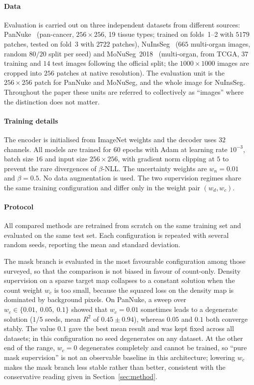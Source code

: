 \documentclass[preprint,12pt]{elsarticle}
\begin{document}
\paragraph{Data} Evaluation is carried out on three independent datasets from different sources:
PanNuke~\cite{pannuke} (pan-cancer, $256\times256$, 19 tissue types; trained on folds~1--2 with $5179$ patches,
tested on fold~3 with $2722$ patches), NuInsSeg~\cite{nuinsseg} ($665$ multi-organ images, random $80/20$ split
per seed) and MoNuSeg~2018~\cite{monuseg} (multi-organ, from TCGA, $37$ training and $14$ test images following
the official split; the $1000\times1000$ images are cropped into $256$ patches at native resolution). The
evaluation unit is the $256\times256$ patch for PanNuke and MoNuSeg, and the whole image for NuInsSeg.
Throughout the paper these units are referred to collectively as ``images'' where the distinction does not
matter.

\paragraph{Training details} The encoder is initialised from ImageNet weights and the decoder uses $32$
channels. All models are trained for $60$ epochs with Adam at learning rate $10^{-3}$, batch size $16$ and
input size $256\times256$, with gradient norm clipping at $5$ to prevent the rare divergences of $\beta$-NLL.
The uncertainty weights are $w_n = 0.01$ and $\beta = 0.5$. No data augmentation is used. The two supervision
regimes share the same training configuration and differ only in the weight pair $(w_d, w_c)$.

\paragraph{Protocol} All compared methods are retrained from scratch on the same training set and evaluated on
the same test set. Each configuration is repeated with several random seeds, reporting the mean and standard
deviation.

The mask branch is evaluated in the most favourable configuration among those surveyed, so that the comparison
is not biased in favour of count-only. Density supervision on a sparse target map collapses to a constant
solution when the count weight $w_c$ is too small, because the squared loss on the density map is dominated by
background pixels. On PanNuke, a sweep over $w_c \in \{0.01,\ 0.05,\ 0.1\}$ showed that $w_c = 0.01$ sometimes
leads to a degenerate solution ($1/5$ seeds, mean $R^2$ of $0.45 \pm 0.94$), whereas $0.05$ and $0.1$ both
converge stably. The value $0.1$ gave the best mean result and was kept fixed across all datasets; in this
configuration no seed degenerates on any dataset. At the other end of the range, $w_c = 0$ degenerates
completely and cannot be trained, so ``pure mask supervision'' is not an observable baseline in this
architecture; lowering $w_c$ makes the mask branch less stable rather than better, consistent with the
conservative reading given in Section~\ref{sec:method}.
\end{document}
